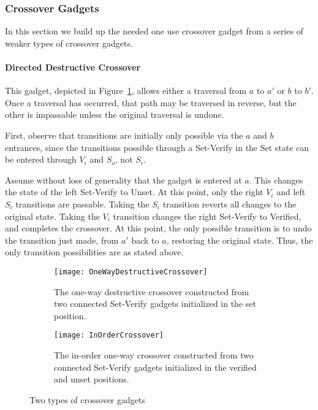 \subsubsection{Crossover Gadgets}
In this section we build up the needed one use crossover gadget from a series of weaker types of crossover gadgets.

\paragraph{Directed Destructive Crossover} This gadget, depicted in Figure~\ref{DestructiveCrossover}, allows either a traversal from $a$ to $a'$ or $b$ to $b'$. Once a traversal has occurred, that path may be traversed in reverse, but the other is impassable unless the original traversal is undone.

First, observe that transitions are initially only possible via the $a$ and $b$ entrances, since the transitions possible through a Set-Verify in the Set state can be entered through $V_i$ and $S_o$, not $S_i$.

Assume without loss of generality that the gadget is entered at $a$. This changes the state of the left Set-Verify to Unset. At this point, only the right $V_i$ and left $S_i$ transitions are passable. Taking the $S_i$ transition reverts all changes to the original state. Taking the $V_i$ transition changes the right Set-Verify to Verified, and completes the crossover. At this point, the only possible transition is to undo the transition just made, from $a'$ back to $a$, restoring the original state. Thus, the only transition possibilities are as stated above.

\begin{figure}[!ht]
  \centering
  \begin{subfigure}[b]{0.47\textwidth}
    \texttt{[image: OneWayDestructiveCrossover]}
    \caption{The one-way destructive crossover constructed from two connected Set-Verify gadgets initialized in the set position.}
    \label{DestructiveCrossover}
  \end{subfigure}
  \hfill
  \begin{subfigure}[b]{0.47\textwidth}
    \texttt{[image: InOrderCrossover]}
    \caption{The in-order one-way crossover constructed from two connected Set-Verify gadgets initialized in the verified and unset positions.}
    \label{InOrderCrossover}
  \end{subfigure}
  \caption{Two types of crossover gadgets}
\end{figure}

